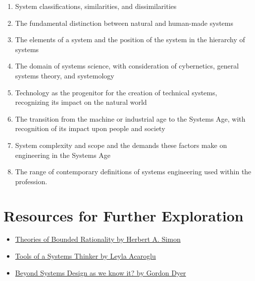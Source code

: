 \begin{enumerate}
\item System classifications, similarities, and dissimilarities
\item The fundamental distinction between natural and human-made systems
\item The elements of a system and the position of the system in the hierarchy of systems
\item The domain of systems science, with consideration of cybernetics, general systems theory, and systemology
\item Technology as the progenitor for the creation of technical systems, recognizing its impact on the natural world
\item The transition from the machine or industrial age to the Systems Age, with recognition of its impact upon people and society
\item System complexity and scope and the demands these factors make on engineering in the Systems Age
\item The range of contemporary definitions of systems engineering used within the profession.
\end{enumerate}

\section*{Resources for Further Exploration}
\begin{itemize}
\item \href{http://innovbfa.viabloga.com/files/Herbert_Simon___theories_of_bounded_rationality___1972.pdf}{Theories of Bounded Rationality by Herbert A. Simon}
\item \href{https://medium.com/disruptive-design/tools-for-systems-thinkers-the-6-fundamental-concepts-of-systems-thinking-379cdac3dc6a}{Tools of a Systems Thinker by Leyla Acaroglu}
\item \href{http://www.afscet.asso.fr/resSystemica/Crete02/Dyer.pdf}{Beyond Systems Design as we know it? by Gordon Dyer}
\end{itemize}


